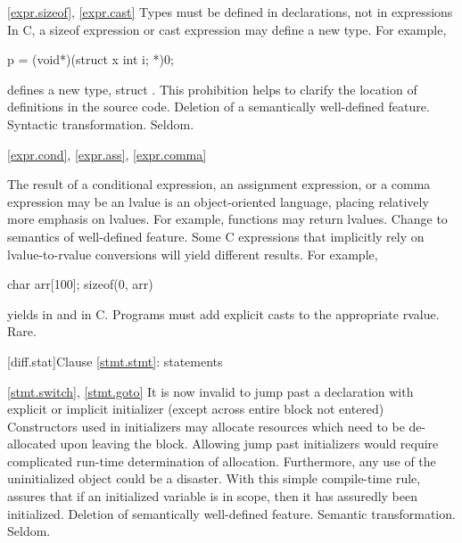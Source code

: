 \ref{expr.sizeof}, \ref{expr.cast}
\change Types must be defined in declarations, not in expressions\\
In C, a sizeof expression or cast expression may define a new type.
For example,
\begin{codeblock}
p = (void*)(struct x {int i;} *)0;
\end{codeblock}
defines a new type, struct  .
\rationale
This prohibition helps to clarify the location of
definitions in the source code.
\effect
Deletion of a semantically well-defined feature.
\difficulty
Syntactic transformation.
\howwide
Seldom.

\ref{expr.cond}, \ref{expr.ass}, \ref{expr.comma}

%
%
%
\change The result of a conditional expression, an assignment expression, or a comma expression may be an lvalue
\rationale
\Cpp is an object-oriented language, placing relatively
more emphasis on lvalues.  For example, functions may
return lvalues.
\effect
Change to semantics of well-defined feature.  Some C
expressions that implicitly rely on lvalue-to-rvalue
conversions will yield different results.  For example,

\begin{codeblock}
char arr[100];
sizeof(0, arr)
\end{codeblock}

yields
in \Cpp and
in C.
\difficulty
Programs must add explicit casts to the appropriate rvalue.
\howwide
Rare.

[diff.stat]{Clause \ref{stmt.stmt}: statements}

\ref{stmt.switch}, \ref{stmt.goto}
\change It is now invalid to jump past a declaration with explicit or implicit initializer (except across entire block not entered)
\rationale
Constructors used in initializers may allocate
resources which need to be de-allocated upon leaving the
block.
Allowing jump past initializers would require
complicated run-time determination of allocation.
Furthermore, any use of the uninitialized object could be a
disaster.
With this simple compile-time rule, \Cpp assures that
if an initialized variable is in scope, then it has assuredly been
initialized.
\effect
Deletion of semantically well-defined feature.
\difficulty
Semantic transformation.
\howwide
Seldom.

